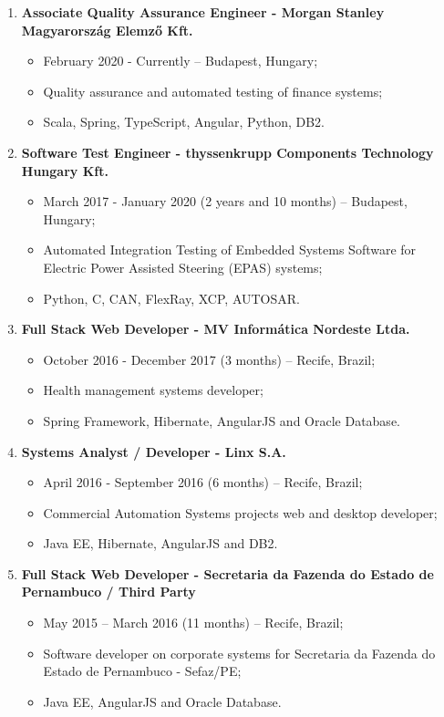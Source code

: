 \documentclass[10pt]{article}
\begin{document}
\begin{enumerate}

	\item \textbf{Associate Quality Assurance Engineer - Morgan Stanley Magyarország Elemző Kft.}
	\begin{itemize}
		\item February 2020 - Currently -- Budapest, Hungary;
		\item Quality assurance and automated testing of finance systems;
		\item Scala, Spring, TypeScript, Angular, Python, DB2.
	\end{itemize}

	\item \textbf{Software Test Engineer - thyssenkrupp Components Technology Hungary Kft.}
	\begin{itemize}
		\item March 2017 - January 2020 (2 years and 10 months) -- Budapest, Hungary;
		\item Automated Integration Testing of Embedded Systems Software for Electric Power Assisted Steering (EPAS) systems;
		\item Python, C, CAN, FlexRay, XCP, AUTOSAR.
	\end{itemize}

	\item \textbf{Full Stack Web Developer - MV Informática Nordeste Ltda.}
	\begin{itemize}
		\item October 2016 - December 2017 (3 months) -- Recife, Brazil;
		\item Health management systems developer;
	    \item Spring Framework, Hibernate, AngularJS and Oracle Database.
	\end{itemize}

	\item \textbf{Systems Analyst / Developer - Linx S.A.}
	\begin{itemize}
		\item April 2016 - September 2016 (6 months) -- Recife, Brazil;
		\item Commercial Automation Systems projects web and desktop developer;
		\item Java EE, Hibernate, AngularJS and DB2.
	\end{itemize}

	\item \textbf{Full Stack Web Developer - Secretaria da Fazenda do Estado de Pernambuco / Third Party}
	\begin{itemize}
		\item May 2015 -- March 2016 (11 months) -- Recife, Brazil;
		\item Software developer on corporate systems for Secretaria da Fazenda do Estado de Pernambuco - Sefaz/PE;
		\item Java EE, AngularJS and Oracle Database.
	\end{itemize}


\end{enumerate}
\end{document}
